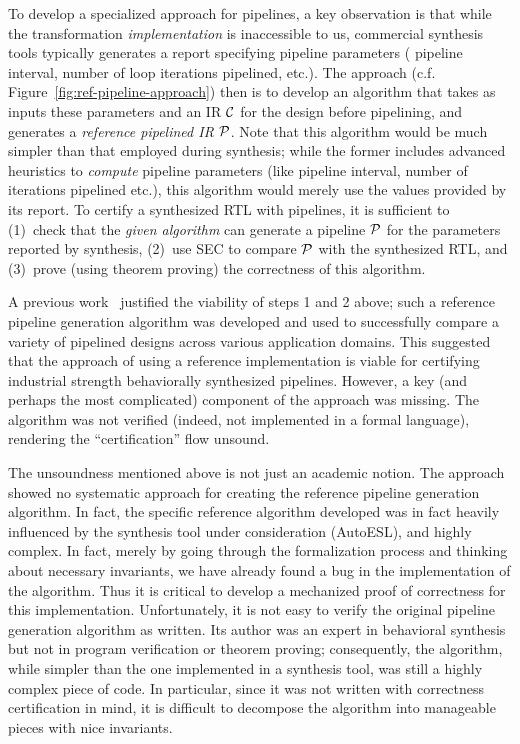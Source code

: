 To develop a specialized approach for pipelines, a key observation
is that while the transformation {\em implementation} is inaccessible
to us, commercial synthesis tools typically generates a report
specifying pipeline parameters (%
pipeline interval, number of loop
iterations pipelined, etc.).  The approach (c.f. Figure~\ref{fig:ref-pipeline-approach})
then is to develop an
algorithm that takes as inputs these parameters and an IR ${\cal{C}}$
for the design before pipelining, and generates a {\em reference
  pipelined IR} ${\cal{P}}$.  Note that this algorithm would be much simpler
than that employed during synthesis; while the former includes
advanced heuristics to {\em compute} pipeline parameters (like
pipeline interval, number of iterations pipelined etc.), this algorithm would merely use
the values provided by its report.  To certify a synthesized RTL with
pipelines, it is sufficient to (1)~check that the {\em given algorithm} can
generate a pipeline ${\cal{P}}$ for the parameters reported by
synthesis, (2)~use SEC to compare ${\cal{P}}$ with the synthesized
RTL, and (3)~prove (using theorem proving) the correctness of this
algorithm.

A previous work~\cite{hrx:dac-12} justified the viability of
steps 1 and 2 above; such a reference pipeline generation algorithm
was developed and used to successfully compare a variety of pipelined
designs across various application domains.  This suggested that the
approach of using a reference implementation is viable for certifying
industrial strength behaviorally synthesized pipelines.  However, a key (and perhaps the
most complicated) component of the approach was missing.  The
algorithm was not verified (indeed, not implemented in a formal
language), rendering the ``certification'' flow unsound.

The unsoundness mentioned above is not just an academic notion.  
The approach showed no systematic approach for
creating the reference pipeline generation algorithm.  In
fact, the specific reference algorithm developed was in fact
heavily influenced by the synthesis tool under consideration
(AutoESL), and highly complex. In
fact, merely by going through the formalization process and thinking
about necessary invariants, we have already found a bug in
the implementation of the algorithm.  
Thus it is critical to develop a mechanized proof of
correctness for this implementation.  Unfortunately, it is not easy to
verify the original pipeline generation algorithm as written.  Its
author was an expert in behavioral synthesis but not in program
verification or theorem proving; consequently, the algorithm, while
simpler than the one implemented in a synthesis tool, was still a highly
complex piece of code.  In particular, since it was not written with
correctness certification in mind, it is difficult to decompose the algorithm into
manageable pieces with nice invariants.


